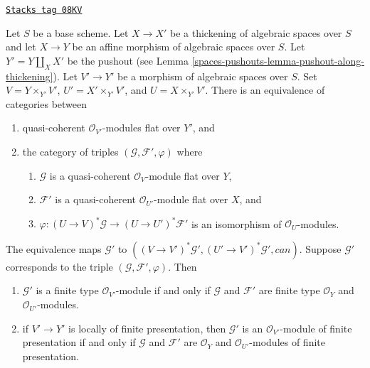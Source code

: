 \begin{lemma}
\label{spaces-pushouts-lemma-space-over-pushout-flat-modules}
\href{https://stacks.math.columbia.edu/tag/08KV}{\texttt{Stacks tag 08KV}}

Let $S$ be a base scheme.
Let $X \to X'$ be a thickening of algebraic spaces over $S$
and let $X \to Y$ be an affine morphism of algebraic spaces over $S$.
Let $Y' = Y \amalg_X X'$ be the pushout
(see Lemma \ref{spaces-pushouts-lemma-pushout-along-thickening}).
Let $V' \to Y'$ be a morphism of algebraic spaces over $S$. Set
$V = Y \times_{Y'} V'$, $U' = X' \times_{Y'} V'$, and $U = X \times_{Y'} V'$.
There is an equivalence of categories between
\begin{enumerate}
\item quasi-coherent $\mathcal{O}_{V'}$-modules flat over $Y'$, and
\item the category of triples $(\mathcal{G}, \mathcal{F}', \varphi)$ where
\begin{enumerate}
\item $\mathcal{G}$ is a quasi-coherent $\mathcal{O}_V$-module flat over $Y$,
\item $\mathcal{F}'$ is a quasi-coherent $\mathcal{O}_{U'}$-module flat
over $X$, and
\item $\varphi : (U \to V)^*\mathcal{G} \to (U \to U')^*\mathcal{F}'$
is an isomorphism of $\mathcal{O}_U$-modules.
\end{enumerate}
\end{enumerate}
The equivalence maps $\mathcal{G}'$ to
$((V \to V')^*\mathcal{G}', (U' \to V')^*\mathcal{G}', can)$.
Suppose $\mathcal{G}'$ corresponds to the triple
$(\mathcal{G}, \mathcal{F}', \varphi)$. Then
\begin{enumerate}
\item[(a)] $\mathcal{G}'$ is a finite type $\mathcal{O}_{V'}$-module if and
only if $\mathcal{G}$ and $\mathcal{F}'$ are finite type
$\mathcal{O}_Y$ and $\mathcal{O}_{U'}$-modules.
\item[(b)] if $V' \to Y'$ is locally of finite presentation, then
$\mathcal{G}'$ is an $\mathcal{O}_{V'}$-module of finite
presentation if and only if $\mathcal{G}$ and $\mathcal{F}'$ are
$\mathcal{O}_Y$ and $\mathcal{O}_{U'}$-modules of finite presentation.
\end{enumerate}
\end{lemma}


